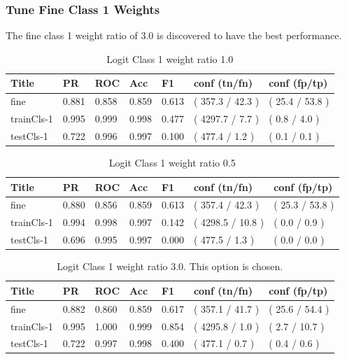 \documentclass[ms]{nuthesis}
\begin{document}
\subsubsection{Tune Fine Class 1 Weights}
\label{sect:startTuneFineClsWeight}
\par The fine class 1 weight ratio of 3.0 is discovered to have the best performance.
\FloatBarrier
\begin{table}[H]
\centering
\caption{Logit Class 1 weight ratio 1.0}
\label{tab:LogRegCls1-Wt1}
\begin{tabular}{|l||l||l||l||l||l||l|}\toprule
Title & PR & ROC & Acc & F1 & conf (tn/fn) & conf (fp/tp) \\ \midrule
fine & 0.881 & 0.858 & 0.859 & 0.613 & ( 357.3 / 42.3 ) & ( 25.4 / 53.8 ) \\
trainCls-1 & 0.995 & 0.999 & 0.998 & 0.477 & ( 4297.7 / 7.7 ) & ( 0.8 / 4.0 ) \\
testCls-1 & 0.722 & 0.996 & 0.997 & 0.100 & ( 477.4 / 1.2 ) & ( 0.1 / 0.1 ) \\ \bottomrule
\end{tabular}
\end{table}
\FloatBarrier


\FloatBarrier
\begin{table}[H]
\centering
\caption{Logit Class 1 weight ratio 0.5}
\label{tab:LogRegCls1-Wtp5}
\begin{tabular}{|l||l||l||l||l||l||l|}\toprule
Title & PR & ROC & Acc & F1 & conf (tn/fn) & conf (fp/tp) \\ \midrule
fine & 0.880 & 0.856 & 0.859 & 0.613 & ( 357.4 / 42.3 ) & ( 25.3 / 53.8 ) \\
trainCls-1 & 0.994 & 0.998 & 0.997 & 0.142 & ( 4298.5 / 10.8 ) & ( 0.0 / 0.9 ) \\
testCls-1 & 0.696 & 0.995 & 0.997 & 0.000 & ( 477.5 / 1.3 ) & ( 0.0 / 0.0 ) \\ \bottomrule
\end{tabular}
\end{table}
\FloatBarrier

\FloatBarrier
\begin{table}[H]
\centering
\caption{Logit Class 1 weight ratio 3.0. This option is chosen.}
\label{tab:LogRegCls1-Wt3}
\begin{tabular}{|l||l||l||l||l||l||l|}\toprule
Title & PR & ROC & Acc & F1 & conf (tn/fn) & conf (fp/tp) \\ \midrule
fine & 0.882 & 0.860 & 0.859 & 0.617 & ( 357.1 / 41.7 ) & ( 25.6 / 54.4 ) \\
trainCls-1 & 0.995 & 1.000 & 0.999 & 0.854 & ( 4295.8 / 1.0 ) & ( 2.7 / 10.7 ) \\
testCls-1 & 0.722 & 0.997 & 0.998 & 0.400 & ( 477.1 / 0.7 ) & ( 0.4 / 0.6 ) \\ \bottomrule
\end{tabular}
\end{table}
\FloatBarrier
\end{document}
